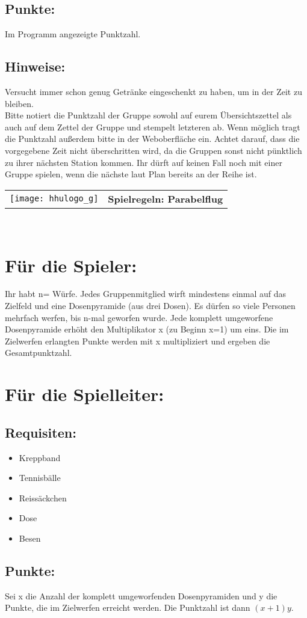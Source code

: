 \documentclass[a4paper,10pt]{article}
\def\spielh{Parabelflug}
\newcommand{\unten}{
 Bitte notiert die Punktzahl der Gruppe sowohl auf eurem Übersichtszettel als auch auf dem Zettel der Gruppe und stempelt letzteren ab. Wenn möglich tragt die Punktzahl außerdem bitte in der Weboberfläche ein.
 Achtet darauf, dass die vorgegebene Zeit nicht überschritten wird, da die Gruppen sonst nicht pünktlich zu ihrer nächsten Station kommen. Ihr dürft auf keinen Fall noch mit einer Gruppe spielen, wenn die nächste laut Plan bereits an der Reihe ist.
}
\begin{document}
\subsection*{Punkte:}
Im Programm angezeigte Punktzahl.

\subsection*{Hinweise:}
Versucht immer schon genug Getränke eingeschenkt zu haben, um in der Zeit zu bleiben.\\
\unten

\newpage


  \begin{tabularx}{\textwidth}{lc}
    \texttt{[image: hhulogo\_g]}
  & {\Huge \textbf{Spielregeln: \spielh}}
  \end{tabularx}\\


\Large
\section*{Für die Spieler:}
Ihr habt n=\underline{\hspace{1cm}} Würfe. Jedes Gruppenmitglied wirft mindestens einmal auf das Zielfeld und eine Dosenpyramide (aus drei Dosen). Es dürfen so viele Personen mehrfach werfen, bis n-mal geworfen wurde. Jede komplett umgeworfene Dosenpyramide erhöht den Multiplikator x (zu Beginn x=1) um eins. Die im Zielwerfen erlangten Punkte werden mit x multipliziert und ergeben die Gesamtpunktzahl.


\section*{Für die Spielleiter:}
\subsection*{Requisiten:} 
\begin{itemize}
 \item Kreppband
 \item Tennisbälle
 \item Reissäckchen
 \item Dose
 \item Besen
\end{itemize}

\subsection*{Punkte:}
Sei x die Anzahl der komplett umgeworfenden Dosenpyramiden und y die Punkte, die im Zielwerfen erreicht werden. Die Punktzahl ist dann $(x+1)y$. 
\end{document}
